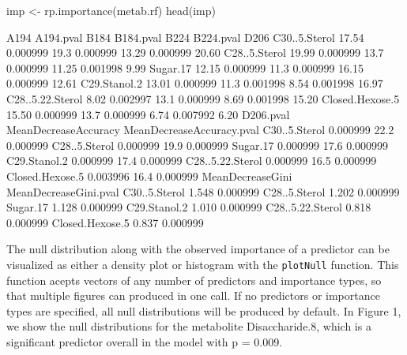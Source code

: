 \begin{Schunk}
\begin{Sinput}
imp <- rp.importance(metab.rf)
head(imp)
\end{Sinput}
\begin{Soutput}
                  A194 A194.pval B184 B184.pval  B224 B224.pval  D206
C30..5.Sterol    17.54  0.000999 19.3  0.000999 13.29  0.000999 20.60
C28..5.Sterol    19.99  0.000999 13.7  0.000999 11.25  0.001998  9.99
Sugar.17         12.15  0.000999 11.3  0.000999 16.15  0.000999 12.61
C29.Stanol.2     13.01  0.000999 11.3  0.001998  8.54  0.001998 16.97
C28..5.22.Sterol  8.02  0.002997 13.1  0.000999  8.69  0.001998 15.20
Closed.Hexose.5  15.50  0.000999 13.7  0.000999  6.74  0.007992  6.20
                 D206.pval MeanDecreaseAccuracy MeanDecreaseAccuracy.pval
C30..5.Sterol     0.000999                 22.2                  0.000999
C28..5.Sterol     0.000999                 19.9                  0.000999
Sugar.17          0.000999                 17.6                  0.000999
C29.Stanol.2      0.000999                 17.4                  0.000999
C28..5.22.Sterol  0.000999                 16.5                  0.000999
Closed.Hexose.5   0.003996                 16.4                  0.000999
                 MeanDecreaseGini MeanDecreaseGini.pval
C30..5.Sterol               1.548              0.000999
C28..5.Sterol               1.202              0.000999
Sugar.17                    1.128              0.000999
C29.Stanol.2                1.010              0.000999
C28..5.22.Sterol            0.818              0.000999
Closed.Hexose.5             0.837              0.000999
\end{Soutput}
\end{Schunk}

The null distribution along with the observed importance of a predictor
can be visualized as either a density plot or histogram with the
\texttt{plotNull} function. This function acepts vectors of any number
of predictors and importance types, so that multiple figures can
produced in one call. If no predictors or importance types are
specified, all null distributions will be produced by default. In Figure
1, we show the null distributions for the metabolite Disaccharide.8,
which is a significant predictor overall in the model with p = 0.009.

